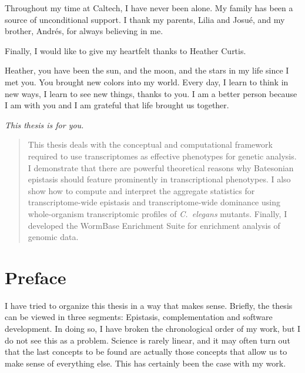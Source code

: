 \documentclass[12pt]{caltech_thesis}
\newcommand{\cel}{\emph{C.~elegans}}
\begin{document}
\begin{acknowledgements}
  Throughout my time at Caltech, I have never been alone. My family has been a
  source of unconditional support. I thank my parents, Lilia and Josué, and my
  brother, Andrés, for always believing in me.

  Finally, I would like to give my heartfelt thanks to Heather Curtis.

  Heather, you have been the sun, and the moon, and the stars in my life since I
  met you. You brought new colors into my world. Every day, I learn to think in
  new ways, I learn to see new things, thanks to you. I am a better person
  because I am with you and I am grateful that life brought us together.

  \emph{This thesis is for you.}
\end{acknowledgements}

\begin{abstract}
  This thesis deals with the conceptual and computational framework required to
  use transcriptomes as effective phenotypes for genetic analysis. I demonstrate
  that there are powerful theoretical reasons why Batesonian epistasis should
  feature prominently in transcriptional phenotypes. I also show how to compute
  and interpret the aggregate statistics for transcriptome-wide epistasis and
  transcriptome-wide dominance using whole-organism transcriptomic profiles of
  \cel{} mutants. Finally, I developed the WormBase Enrichment Suite for
  enrichment analysis of genomic data.
\end{abstract}

\begin{publishedcontent}[iknowwhattodo]

\nocite{Angeles-Albores2018a, Angeles-Albores2018b,
        Angeles-Albores2017, Angeles-Albores2016}
\nocite{Angeles2018micro}
\end{publishedcontent}

\tableofcontents
\listoffigures
\listoftables

\mainmatter{}

\chapter*{Preface}

I have tried to organize this thesis in a way that makes sense. Briefly, the
thesis can be viewed in three segments: Epistasis, complementation and software
development. In doing so, I have broken the chronological order of my work, but
I do not see this as a problem. Science is rarely linear, and it may often turn
out that the last concepts to be found are actually those concepts that allow us
to make sense of everything else. This has certainly been the case with my work.
\end{document}
